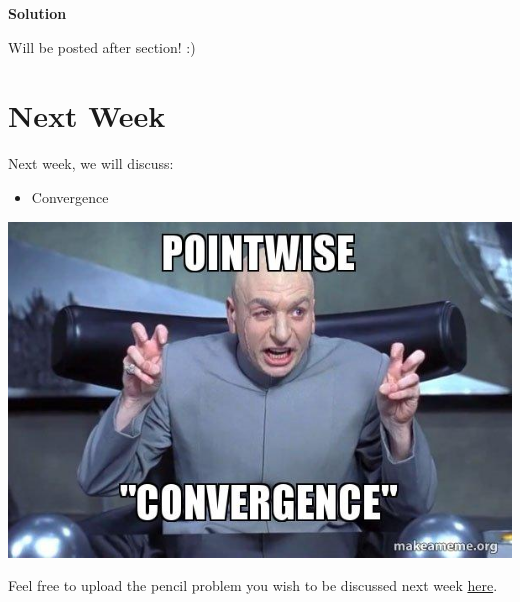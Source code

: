 \documentclass[
  letterpaper,
  DIV=11,
  numbers=noendperiod]{scrreprt}
\providecommand{\tightlist}{%
  \setlength{\itemsep}{0pt}\setlength{\parskip}{0pt}}\usepackage{longtable,booktabs,array}
\theoremstyle{plain}
\theoremstyle{definition}
\theoremstyle{remark}
\begin{document}
\begin{tcolorbox}[enhanced jigsaw, breakable, colback=white, opacityback=0, bottomrule=.15mm, colframe=quarto-callout-tip-color-frame, arc=.35mm, leftrule=.75mm, left=2mm, rightrule=.15mm, toprule=.15mm]
\begin{minipage}[t]{5.5mm}
\textcolor{quarto-callout-tip-color}{\faLightbulb}
\end{minipage}%
\begin{minipage}[t]{\textwidth - 5.5mm}

\textbf{Solution}\vspace{2mm}

Will be posted after section! :)

\end{minipage}%
\end{tcolorbox}

\hypertarget{next-week-7}{%
\section*{Next Week}\label{next-week-7}}


Next week, we will discuss:

\begin{itemize}
\tightlist
\item
  Convergence
\end{itemize}

\includegraphics{./assets/img/convergence.jpeg}

Feel free to upload the pencil problem you wish to be discussed next
week \href{https://forms.gle/RBmMNYJp4u3qD5W79}{here}.
\end{document}
